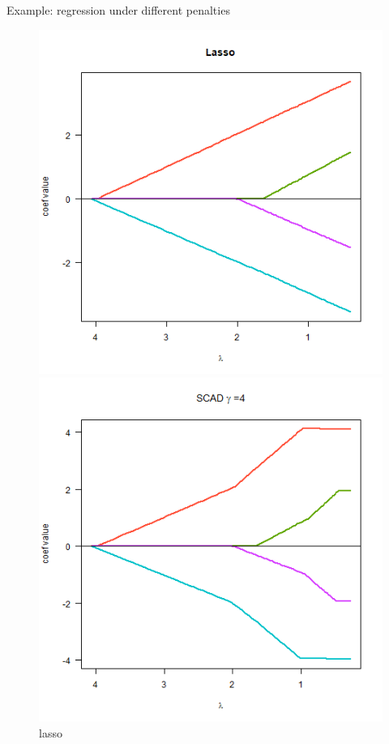 \documentclass[11pt,compress,t,notes=noshow, xcolor=table]{beamer}
\begin{document}
\begin{vbframe}{Example: regression under different penalties}

  \begin{figure}[h]
    \begin{minipage}{0.32\linewidth}
      \vspace{3pt}
      \centerline{\includegraphics[width=\textwidth]{figure/other-pen-lasso.png}}
      \caption{lasso}
    \end{minipage}
    \begin{minipage}{0.32\linewidth}
      \vspace{3pt}
      \centerline{\includegraphics[width=\textwidth]{figure/other-pen-SCAD.png}}

\end{minipage}
\end{figure}
\end{vbframe}
\end{document}
